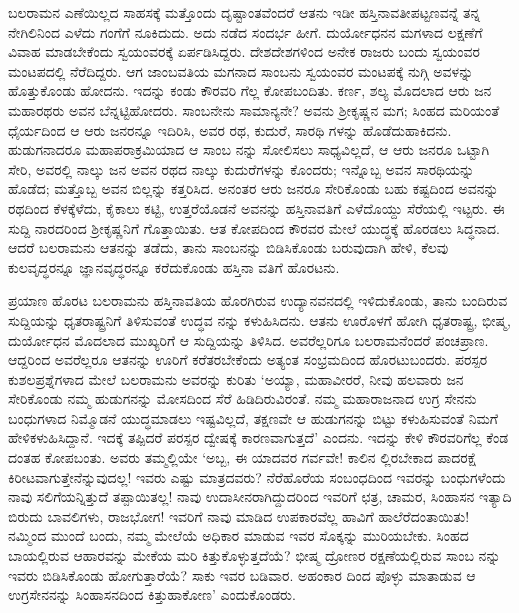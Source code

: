 ಬಲರಾಮನ ಎಣೆಯಿಲ್ಲದ ಸಾಹಸಕ್ಕೆ ಮತ್ತೊಂದು ದೃಷ್ಟಾಂತವೆಂದರೆ ಆತನು ಇಡೀ ಹಸ್ತಿನಾವತೀಪಟ್ಟಣವನ್ನೆ ತನ್ನ ನೇಗಿಲಿನಿಂದ ಎಳೆದು ಗಂಗೆಗೆ ನೂಕಿದುದು. ಅದು ನಡೆದ ಸಂದರ್ಭ ಹೀಗೆ. ದುರ್ಯೋಧನನ ಮಗಳಾದ ಲಕ್ಷಣೆಗೆ ವಿವಾಹ ಮಾಡಬೇಕೆಂದು ಸ್ವಯಂವರಕ್ಕೆ ಏರ್ಪಡಿಸಿದ್ದರು. ದೇಶದೇಶಗಳಿಂದ ಅನೇಕ ರಾಜರು ಬಂದು ಸ್ವಯಂವರ ಮಂಟಪದಲ್ಲಿ ನೆರೆದಿದ್ದರು. ಆಗ ಜಾಂಬವತಿಯ ಮಗನಾದ ಸಾಂಬನು ಸ್ವಯಂವರ ಮಂಟಪಕ್ಕೆ ನುಗ್ಗಿ ಅವಳನ್ನು ಹೊತ್ತುಕೊಂಡು ಹೋದನು. ಇದನ್ನು ಕಂಡು ಕೌರವರಿ ಗೆಲ್ಲ ಕೋಪಬಂದಿತು. ಕರ್ಣ, ಶಲ್ಯ ಮೊದಲಾದ ಆರು ಜನ ಮಹಾರಥರು ಅವನ ಬೆನ್ನಟ್ಟಿಹೋದರು. ಸಾಂಬನೇನು ಸಾಮಾನ್ಯನೇ? ಅವನು ಶ್ರೀಕೃಷ್ಣನ ಮಗ; ಸಿಂಹದ ಮರಿಯಂತೆ ಧೈರ್ಯದಿಂದ ಆ ಆರು ಜನರನ್ನೂ ಇದಿರಿಸಿ, ಅವರ ರಥ, ಕುದುರೆ, ಸಾರಥಿ ಗಳನ್ನು ಹೊಡೆದುಹಾಕಿದನು. ಹುಡುಗನಾದರೂ ಮಹಾಪರಾಕ್ರಮಿಯಾದ ಆ ಸಾಂಬ ನನ್ನು ಸೋಲಿಸಲು ಸಾಧ್ಯವಿಲ್ಲದೆ, ಆ ಆರು ಜನರೂ ಒಟ್ಟಾಗಿ ಸೇರಿ, ಅವರಲ್ಲಿ ನಾಲ್ಕು ಜನ ಅವನ ರಥದ ನಾಲ್ಕು ಕುದುರೆಗಳನ್ನು ಕೊಂದರು; ಇನ್ನೊಬ್ಬ ಅವನ ಸಾರಥಿಯನ್ನು ಹೊಡೆದ; ಮತ್ತೊಬ್ಬ ಅವನ ಬಿಲ್ಲನ್ನು ಕತ್ತರಿಸಿದ. ಅನಂತರ ಆರು ಜನರೂ ಸೇರಿಕೊಂಡು ಬಹು ಕಷ್ಟದಿಂದ ಅವನನ್ನು ರಥದಿಂದ ಕೆಳಕ್ಕೆಳೆದು, ಕೈಕಾಲು ಕಟ್ಟಿ, ಉತ್ತರೆಯೊಡನೆ ಅವನನ್ನು ಹಸ್ತಿನಾವತಿಗೆ ಎಳೆದೊಯ್ದು ಸೆರೆಯಲ್ಲಿ ಇಟ್ಟರು. ಈ ಸುದ್ದಿ ನಾರದರಿಂದ ಶ್ರೀಕೃಷ್ಣನಿಗೆ ಗೊತ್ತಾಯಿತು. ಆತ ಕೋಪದಿಂದ ಕೌರವರ ಮೇಲೆ ಯುದ್ಧಕ್ಕೆ ಹೊರಡಲು ಸಿದ್ಧನಾದ. ಆದರೆ ಬಲರಾಮನು ಆತನನ್ನು ತಡೆದು, ತಾನು ಸಾಂಬನನ್ನು ಬಿಡಿಸಿಕೊಂಡು ಬರುವುದಾಗಿ ಹೇಳಿ, ಕೆಲವು ಕುಲವೃದ್ಧರನ್ನೂ ಜ್ಞಾನವೃದ್ಧರನ್ನೂ ಕರೆದುಕೊಂಡು ಹಸ್ತಿನಾ ವತಿಗೆ ಹೊರಟನು.

ಪ್ರಯಾಣ ಹೊರಟ ಬಲರಾಮನು ಹಸ್ತಿನಾವತಿಯ ಹೊರಗಿರುವ ಉದ್ಯಾನವನದಲ್ಲಿ ಇಳಿದುಕೊಂಡು, ತಾನು ಬಂದಿರುವ ಸುದ್ದಿಯನ್ನು ಧೃತರಾಷ್ಟ್ರನಿಗೆ ತಿಳಿಸುವಂತೆ ಉದ್ಧವ ನನ್ನು ಕಳುಹಿಸಿದನು. ಆತನು ಊರೊಳಗೆ ಹೋಗಿ ಧೃತರಾಷ್ಟ್ರ, ಭೀಷ್ಮ, ದುರ್ಯೋಧನ ಮೊದಲಾದ ಮುಖ್ಯರಿಗೆ ಆ ಸುದ್ದಿಯನ್ನು ತಿಳಿಸಿದ. ಅವರೆಲ್ಲರಿಗೂ ಬಲರಾಮನೆಂದರೆ ಪಂಚಪ್ರಾಣ. ಆದ್ದರಿಂದ ಅವರೆಲ್ಲರೂ ಆತನನ್ನು ಊರಿಗೆ ಕರೆತರಬೇಕೆಂದು ಅತ್ಯಂತ ಸಂಭ್ರಮದಿಂದ ಹೊರಟುಬಂದರು. ಪರಸ್ಪರ ಕುಶಲಪ್ರಶ್ನೆಗಳಾದ ಮೇಲೆ ಬಲರಾಮನು ಅವರನ್ನು ಕುರಿತು ‘ಅಯ್ಯಾ, ಮಹಾವೀರರೆ, ನೀವು ಹಲವಾರು ಜನ ಸೇರಿಕೊಂಡು ನಮ್ಮ ಹುಡುಗನನ್ನು ಮೋಸದಿಂದ ಸೆರೆ ಹಿಡಿದಿರುವಿರಂತೆ. ನಮ್ಮ ಮಹಾರಾಜನಾದ ಉಗ್ರ ಸೇನನು ಬಂಧುಗಳಾದ ನಿಮ್ಮೊಡನೆ ಯುದ್ಧಮಾಡಲು ಇಷ್ಟವಿಲ್ಲದೆ, ತಕ್ಷಣವೇ ಆ ಹುಡುಗನನ್ನು ಬಿಟ್ಟು ಕಳುಹಿಸುವಂತೆ ನಿಮಗೆ ಹೇಳಿಕಳುಹಿಸಿದ್ದಾನೆ. ಇದಕ್ಕೆ ತಪ್ಪಿದರೆ ಪರಸ್ಪರ ದ್ವೇಷಕ್ಕೆ ಕಾರಣವಾಗುತ್ತದೆ’ ಎಂದನು. ಇದನ್ನು ಕೇಳಿ ಕೌರವರಿಗೆಲ್ಲ ಕೆಂಡ ದಂತಹ ಕೋಪಬಂತು. ಅವರು ತಮ್ಮಲ್ಲಿಯೇ ‘ಅಬ್ಬ, ಈ ಯಾದವರ ಗರ್ವವೇ! ಕಾಲಿನ ಲ್ಲಿರಬೇಕಾದ ಪಾದರಕ್ಷೆ ಕಿರೀಟವಾಗುತ್ತೇನೆನ್ನುವುದಲ್ಲ! ಇವರು ಎಷ್ಟು ಮಾತ್ರದವರು? ನೆರೆಹೊರೆಯ ಸಂಬಂಧದಿಂದ ಇವರನ್ನು ಬಂಧುಗಳೆಂದು ನಾವು ಸಲಿಗೆಯನ್ನಿತ್ತುದೆ ತಪ್ಪಾಯಿತಲ್ಲ! ನಾವು ಉದಾಸೀನರಾಗಿದ್ದುದರಿಂದ ಇವರಿಗೆ ಛತ್ರ, ಚಾಮರ, ಸಿಂಹಾಸನ ಇತ್ಯಾದಿ ಬಿರುದು ಬಾವಲಿಗಳು, ರಾಜಭೋಗ! ಇವರಿಗೆ ನಾವು ಮಾಡಿದ ಉಪಕಾರವೆಲ್ಲ ಹಾವಿಗೆ ಹಾಲೆರೆದಂತಾಯಿತು! ನಮ್ಮಿಂದ ಮುಂದೆ ಬಂದು, ನಮ್ಮ ಮೇಲೆಯೆ ಅಧಿಕಾರ ಮಾಡುವ ಇವರ ಸೊಕ್ಕನ್ನು ಮುರಿಯಬೇಕು. ಸಿಂಹದ ಬಾಯಲ್ಲಿರುವ ಆಹಾರವನ್ನು ಮೇಕೆಯ ಮರಿ ಕಿತ್ತುಕೊಳ್ಳುತ್ತದೆಯೆ? ಭೀಷ್ಮ ದ್ರೋಣರ ರಕ್ಷಣೆಯಲ್ಲಿರುವ ಸಾಂಬ ನನ್ನು ಇವರು ಬಿಡಿಸಿಕೊಂಡು ಹೋಗುತ್ತಾರೆಯೆ? ಸಾಕು ಇವರ ಬಡಿವಾರ. ಅಹಂಕಾರ ದಿಂದ ಪೊಳ್ಳು ಮಾತಾಡುವ ಆ ಉಗ್ರಸೇನನನ್ನು ಸಿಂಹಾಸನದಿಂದ ಕಿತ್ತುಹಾಕೋಣ’ ಎಂದುಕೊಂಡರು.

